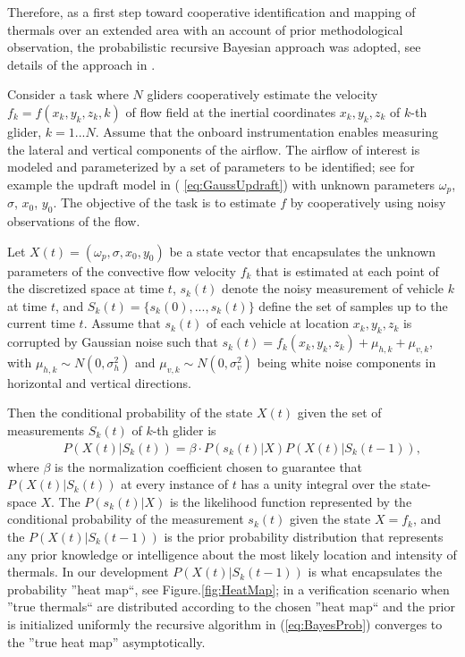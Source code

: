 \documentclass{ifacconf}
\begin{document}
Therefore, as a first step toward cooperative identification and mapping of thermals over an extended area with an account of prior methodological observation, the probabilistic recursive Bayesian approach was adopted, see details of the approach in \cite{Bergman:1999}.

Consider a task where $N$ gliders cooperatively estimate the velocity $f_k=f(x_k,y_k,z_k,k)$ of flow field  at  the inertial coordinates $x_k,y_k,z_k$  of $k$-th glider, $k=1...N$. Assume that the onboard instrumentation enables measuring the lateral and vertical components of the airflow. The airflow of interest is modeled and parameterized by a set of parameters to be identified;  see for example the updraft model in ( \ref{eq:GaussUpdraft}) with unknown parameters $\omega_p$, $\sigma$, $x_0$, $y_0$. The objective of the task is to estimate $f$ by cooperatively using noisy observations of the flow.

Let $X(t)=(\omega_p, \sigma, x_0, y_0)$ be a state vector that encapsulates the unknown parameters of the convective flow velocity $f_k$ that is estimated at each point of the discretized space at time $t$, $s_k(t)$ denote the noisy measurement of vehicle $k$ at time $t$, and $S_k(t)=\{s_k(0),...,s_k(t)\}$ define the set of samples up to the current time $t$. Assume that $s_k(t)$ of each vehicle at location $x_k,y_k,z_k$ is corrupted by Gaussian noise such that $s_k(t)=f_k(x_k,y_k,z_k)+\mu_{h,k}+\mu_{v,k}$, with $\mu_{h,k}\sim N(0,\sigma^2_h)$ and $\mu_{v,k}\sim N(0,\sigma^2_v)$ being white noise components in horizontal and vertical directions.

Then the conditional probability of the state $X(t)$ given the set of measurements $S_k(t)$ of $k$-th glider is
\begin{eqnarray}
    && P(X(t)\vert S_k(t))=\beta \cdot P(s_k(t) \vert X)P(X(t) \vert S_k(t-1)),
    \label{eq:BayesProb}
\end{eqnarray}
where $\beta$ is the normalization coefficient chosen to guarantee that $P(X(t)\vert S_k(t))$ at every instance of $t$ has a unity integral over the state-space $X$.  The $P(s_k(t) \vert X)$ is the likelihood function represented by the conditional probability of the measurement $s_k(t)$ given the state $X=f_k$, and the $P(X(t) \vert S_k(t-1))$ is the prior probability distribution that represents any prior knowledge or intelligence about the most likely location and intensity of thermals. In our development $P(X(t) \vert S_k(t-1))$ is what encapsulates the probability ''heat map``, see Figure.\ref{fig:HeatMap}; in a verification scenario when ''true thermals`` are distributed according to the chosen ''heat map`` and the prior is initialized uniformly the recursive algorithm in (\ref{eq:BayesProb}) converges   to the ''true heat map'' asymptotically.
\end{document}
